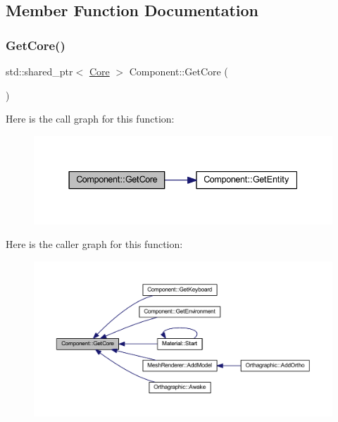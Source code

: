 \subsection{Member Function Documentation}
\mbox{\label{class_component_a601ec93559ca1dd75c2c1ea13510594d}} 
\subsubsection{\texorpdfstring{Get\+Core()}{GetCore()}}
{\footnotesize\ttfamily std\+::shared\+\_\+ptr$<$ \mbox{\hyperlink{class_core}{Core}} $>$ Component\+::\+Get\+Core (\begin{DoxyParamCaption}{ }\end{DoxyParamCaption})}

Here is the call graph for this function\+:
\nopagebreak
\begin{figure}[H]
\begin{center}
\leavevmode
\includegraphics[width=337pt]{class_component_a601ec93559ca1dd75c2c1ea13510594d_cgraph}
\end{center}
\end{figure}
Here is the caller graph for this function\+:
\nopagebreak
\begin{figure}[H]
\begin{center}
\leavevmode
\includegraphics[width=350pt]{class_component_a601ec93559ca1dd75c2c1ea13510594d_icgraph}
\end{center}
\end{figure}
\mbox{\label{class_component_a746298ddfd39da5b191926aa8d8f6d95}} 
